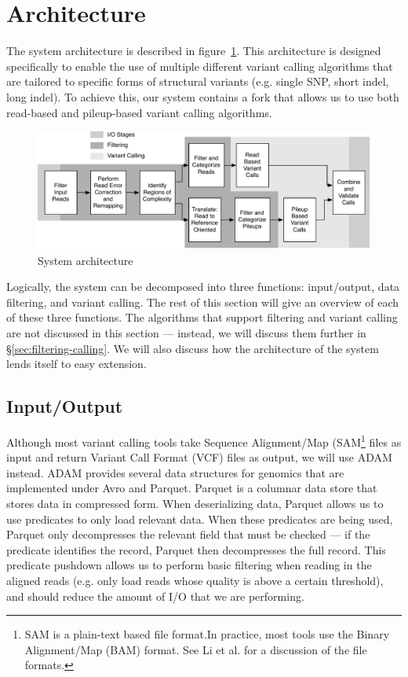\documentclass[11pt]{article}
\begin{document}
\section{Architecture}
\label{sec:architecture}

The system architecture is described in figure~\ref{fig:architecture}. This architecture is designed specifically to enable
the use of multiple different variant calling algorithms that are tailored to specific forms of structural variants (e.g. single
SNP, short indel, long indel). To achieve this, our system contains a fork that allows us to use both read-based and
pileup-based variant calling algorithms.

\begin{figure}[h]
\begin{center}
\includegraphics[width=0.9\linewidth]{avocado-architecture.pdf}
\end{center}
\caption{System architecture}
\label{fig:architecture}
\end{figure}

Logically, the system can be decomposed into three functions: input/out\-put, data filtering, and variant calling. The rest of this
section will give an overview of each of these three functions. The algorithms that support filtering and variant calling are not
discussed in this section --- instead, we will discuss them further in \S\ref{sec:filtering-calling}. We will also discuss how the
architecture of the system lends itself to easy extension.

\subsection{Input/Output}
\label{sec:io}

Although most variant calling tools take Sequence Alignment/Map (SAM\footnote{SAM is a plain-text based file format.In
practice, most tools use the Binary Alignment/Map (BAM) format. See Li et al.\cite{li09} for a discussion of the file formats.} files
as input and return Variant Call Format (VCF) files as output, we will use ADAM instead. ADAM provides several data structures for
genomics that are implemented under Avro and Parquet. Parquet is a columnar data store that stores data in compressed form.
When deserializing data, Parquet allows us to use predicates to only load relevant data. When these predicates are being used,
Parquet only decompresses the relevant field that must be checked --- if the predicate identifies the record, Parquet then
decompresses the full record. This predicate pushdown allows us to perform basic filtering when reading in the aligned
reads (e.g. only load reads whose quality is above a certain threshold), and should reduce the amount of I/O that we are performing.
\end{document}
